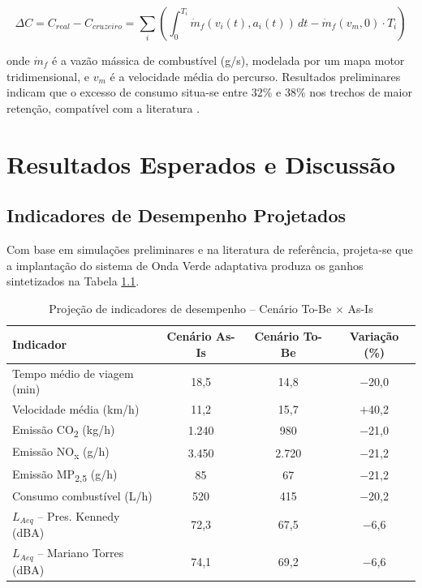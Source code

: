 \documentclass[12pt,a4paper,oneside]{abntex2}
\begin{document}
\begin{equation}
\Delta C = C_{real} - C_{cruzeiro} = \sum_i \left( \int_0^{T_i} \dot{m}_f(v_i(t), a_i(t)) \, dt - \dot{m}_f(v_m, 0) \cdot T_i \right)
\label{eq:excesso}
\end{equation}

onde $\dot{m}_f$ é a vazão mássica de combustível (g/s), modelada por um mapa motor tridimensional, e $v_m$ é a velocidade média do percurso. Resultados preliminares indicam que o excesso de consumo situa-se entre 32\% e 38\% nos trechos de maior retenção, compatível com a literatura \cite{EPA2023}.

\chapter{Resultados Esperados e Discussão}

\section{Indicadores de Desempenho Projetados}

Com base em simulações preliminares e na literatura de referência, projeta-se que a implantação do sistema de Onda Verde adaptativa produza os ganhos sintetizados na Tabela \ref{tab:resultados}.

\begin{table}[H]
\centering
\caption{Projeção de indicadores de desempenho -- Cenário To-Be $\times$ As-Is}
\label{tab:resultados}
\begin{tabularx}{\textwidth}{l c c c}
\toprule
\textbf{Indicador} & \textbf{Cenário As-Is} & \textbf{Cenário To-Be} & \textbf{Variação (\%)} \\
\midrule
Tempo médio de viagem (min) & 18,5 & 14,8 & $-$20,0 \\
Velocidade média (km/h) & 11,2 & 15,7 & $+$40,2 \\
Emissão CO\textsubscript{2} (kg/h) & 1.240 & 980 & $-$21,0 \\
Emissão NO\textsubscript{x} (g/h) & 3.450 & 2.720 & $-$21,2 \\
Emissão MP\textsubscript{2,5} (g/h) & 85 & 67 & $-$21,2 \\
Consumo combustível (L/h) & 520 & 415 & $-$20,2 \\
$L_{Aeq}$ -- Pres. Kennedy (dBA) & 72,3 & 67,5 & $-$6,6 \\
$L_{Aeq}$ -- Mariano Torres (dBA) & 74,1 & 69,2 & $-$6,6 \\
\bottomrule
\end{tabularx}
\end{table}
\end{document}
